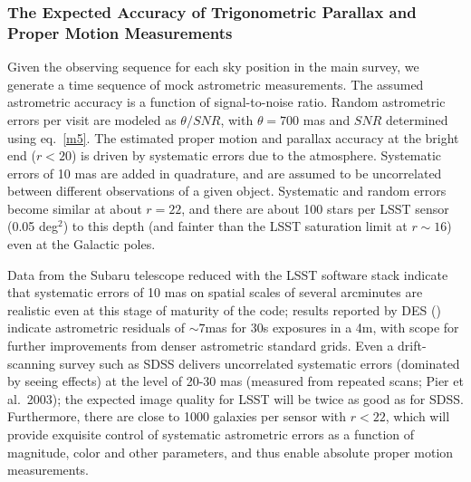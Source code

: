 \subsubsection{The Expected Accuracy of Trigonometric Parallax and Proper Motion Measurements }
\label{sec:astrom}

Given the observing sequence for each sky position in the main survey, we
generate a time sequence of mock astrometric measurements. The assumed astrometric
accuracy is a function of signal-to-noise ratio. Random astrometric errors per
visit are modeled as $\theta/SNR$, with $\theta=700$ mas and $SNR$ determined using
eq.~\ref{m5}. The estimated proper motion and parallax accuracy at the bright end
($r<20$) is driven by systematic errors due to the atmosphere. Systematic
errors of 10 mas are added in quadrature, and are assumed to be {uncorrelated}
between different observations of a given object. Systematic and random
errors become similar at about $r=22$, and there are about 100 stars per LSST
sensor (0.05 deg$^2$) to this depth (and fainter than the LSST saturation limit at
$r\sim16$) even at the Galactic poles.

Data from the Subaru telescope reduced with the LSST software stack indicate that systematic errors of
10 mas on spatial scales of several arcminutes are realistic even at this stage of maturity of the
code; results reported by DES (\cite{}) indicate astrometric residuals of $\sim 7$mas for 30s exposures
in a 4m, with scope for further improvements from denser astrometric standard grids. Even a drift-scanning
survey such as SDSS delivers uncorrelated systematic errors (dominated by seeing
effects) at the level of 20-30 mas (measured from repeated scans; Pier et al.~2003);
the expected image quality for LSST will be twice as good as for SDSS. Furthermore,
there are close to 1000 galaxies per sensor with $r<22$, which will provide exquisite
control of systematic astrometric errors as a function of magnitude, color and other
parameters, and thus enable absolute proper motion measurements.



